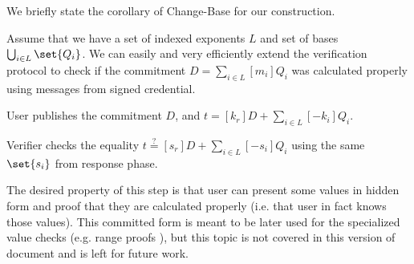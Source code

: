 We briefly state the corollary of Change-Base for our construction.
\begin{corollary}
Assume that we have a set of indexed exponents $L$ and set of bases $\bigcup_{i \in L} \set{Q_i}$.
We can easily and very efficiently extend the verification protocol to check if the commitment $D = \sum_{i \in L} [m_i]Q_i$ was calculated properly using messages from signed credential.

User publishes the commitment $D$, and $t = [k_r]D + \sum_{i \in L} [-k_i] Q_i$.

Verifier checks the equality $t \stackrel{?}{=} [s_r]D + \sum_{i \in L} [-s_i] Q_i$ using the same $\set{s_i}$ from response phase.

\end{corollary}
The desired property of this step is that user can present some values in hidden form and proof that they are calculated properly (i.e. that user in fact knows those values). This committed form is meant to be later used for the specialized value checks (e.g. range proofs \cite{bulletproofs}), but this topic is not covered in this version of document and is left for future work. 



